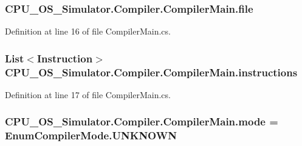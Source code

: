 \subsubsection[{file}]{ C\+P\+U\+\_\+\+O\+S\+\_\+\+Simulator.\+Compiler.\+Compiler\+Main.\+file\hspace{0.3cm}{\ttfamily [private]}}\label{class_c_p_u___o_s___simulator_1_1_compiler_1_1_compiler_main_ac6a47299c228ea71c732f35572fa666f}


Definition at line 16 of file Compiler\+Main.\+cs.

\hypertarget{class_c_p_u___o_s___simulator_1_1_compiler_1_1_compiler_main_a0b0b37341f48e60f2ee769ea4ba760d2}{}
\subsubsection[{instructions}]{\setlength{\rightskip}{0pt plus 5cm}List$<${\bf Instruction}$>$ C\+P\+U\+\_\+\+O\+S\+\_\+\+Simulator.\+Compiler.\+Compiler\+Main.\+instructions\hspace{0.3cm}{\ttfamily [private]}}\label{class_c_p_u___o_s___simulator_1_1_compiler_1_1_compiler_main_a0b0b37341f48e60f2ee769ea4ba760d2}


Definition at line 17 of file Compiler\+Main.\+cs.

\hypertarget{class_c_p_u___o_s___simulator_1_1_compiler_1_1_compiler_main_a064e52c2639d79cdec216d4ee7d384e9}{}
\subsubsection[{mode}]{ C\+P\+U\+\_\+\+O\+S\+\_\+\+Simulator.\+Compiler.\+Compiler\+Main.\+mode = {\bf Enum\+Compiler\+Mode.\+U\+N\+K\+N\+O\+W\+N}\hspace{0.3cm}{\ttfamily [private]}}\label{class_c_p_u___o_s___simulator_1_1_compiler_1_1_compiler_main_a064e52c2639d79cdec216d4ee7d384e9}


